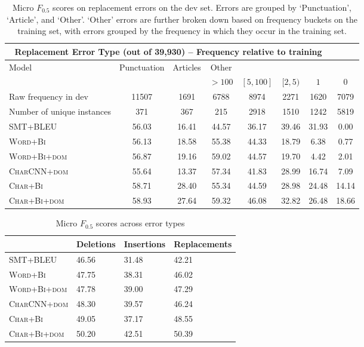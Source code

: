 \documentclass[11pt,letterpaper]{article}
\begin{document}
\begin{table*}
\centering
\footnotesize
\begin{tabular}{lccccccc}
\toprule
 \multicolumn{7}{c}{Replacement Error Type (out of 39,930) -- Frequency relative to training}  \\
\midrule
Model & Punctuation  & Articles & Other \\
& & &  $>100$ & $[5,100]$ &  $[2,5)$ & $1$ & $0$  \\
\midrule
Raw frequency in dev & 11507 & 1691 & 6788 & 8974 & 2271 & 1620 & 7079 \\ 
Number of unique instances & 371 & 367 & 215 & 2918 & 1510 & 1242 & 5819 \\ 
\midrule
\textsc{SMT+BLEU} & 56.03 & 16.41 & 44.57 & 36.17 & 39.46 & 31.93 & 0.00  \\ 
\midrule
\textsc{Word+Bi} & 56.13 & 18.58 & 55.38 & 44.33 & 18.79 & 6.38 & 0.77 \\  
\textsc{Word+Bi+dom} & 56.87 & 19.16 & 59.02 & 44.57 & 19.70 & 4.42 & 2.01 \\ 
\midrule
\textsc{CharCNN+dom} & 55.64 & 13.37 & 57.34 & 41.83 & 28.99 & 16.74 & 7.09 \\ 
\midrule
\textsc{Char+Bi}  & 58.71 & 28.40 & 55.34 & 44.59 & 28.98 & 24.48 & 14.14 \\ 
\textsc{Char+Bi+dom} & 58.93 & 27.64 & 59.32 & 46.08 & 32.82 & 26.48 & 18.66 \\
\bottomrule
\end{tabular}
\caption{\small{Micro $F_{0.5}$ scores on replacement errors on the dev set. Errors are grouped by `Punctuation', `Article', and `Other'. `Other' errors are further broken down based on frequency buckets on the training set, with errors grouped by the frequency in which they occur in the training set.}}
\label{table:replacementsTrainingFreq}
\end{table*}


\begin{table}
\centering
\small
\begin{tabular}{p{22mm}P{10mm}P{10mm}P{18mm}}
\toprule
& Deletions & Insertions & Replacements \\
\midrule
\textsc{SMT+BLEU} & 46.56 & 31.48 & 42.21\\ 
\midrule
\textsc{Word+Bi} & 47.75 & 38.31  & 46.02 \\ 
\textsc{Word+Bi+dom} & 47.78 & 39.00 & 47.29 \\ 
\midrule
\textsc{CharCNN+dom} & 48.30 & 39.57 & 46.24 \\ 
\midrule
\textsc{Char+Bi} & 49.05 & 37.17 & 48.55 \\
\textsc{Char+Bi+dom} & 50.20 & 42.51 & 50.39 \\ 
\bottomrule
\end{tabular}
\caption{\small{Micro $F_{0.5}$ scores across error types}}
\label{table:deletionsInsertionsTrainingFreq}
\end{table}
\end{document}
